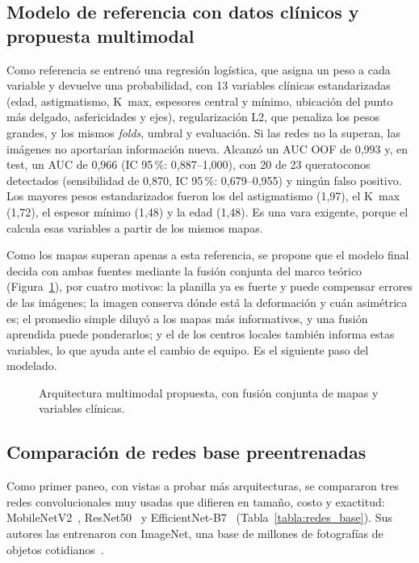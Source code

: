     \subsection{Modelo de referencia con datos clínicos y propuesta multimodal}

        Como referencia se entrenó una regresión logística, que asigna un peso a cada variable y devuelve una probabilidad, con 13 variables clínicas estandarizadas (edad, astigmatismo, K~max, espesores central y mínimo, ubicación del punto más delgado, asfericidades y ejes), regularización L2, que penaliza los pesos grandes, y los mismos \textit{folds}, umbral y evaluación. Si las redes no la superan, las imágenes no aportarían información nueva. Alcanzó un AUC OOF de 0,993 y, en test, un AUC de 0,966 (IC 95\,\%: 0,887--1,000), con 20 de 23 queratoconos detectados (sensibilidad de 0,870, IC 95\,\%: 0,679--0,955) y ningún falso positivo. Los mayores pesos estandarizados fueron los del astigmatismo (\textminus{}1,97), el K~max (1,72), el espesor mínimo (\textminus{}1,48) y la edad (\textminus{}1,48). Es una vara exigente, porque el \Orbscan{} calcula esas variables a partir de los mismos mapas.

        Como los mapas superan apenas a esta referencia, se propone que el modelo final decida con ambas fuentes mediante la fusión conjunta del marco teórico~\cite{huang_fusion} (Figura~\ref{fig:esquema_fusion}), por cuatro motivos: la planilla ya es fuerte y puede compensar errores de las imágenes; la imagen conserva dónde está la deformación y cuán asimétrica es; el promedio simple diluyó a los mapas más informativos, y una fusión aprendida puede ponderarlos; y el \Pentacam{} de los centros locales también informa estas variables, lo que ayuda ante el cambio de equipo. Es el siguiente paso del modelado.

        \begin{figure}[!htbp] \centering
            
            \caption{Arquitectura multimodal propuesta, con fusión conjunta de mapas y variables clínicas.}
            \label{fig:esquema_fusion}
        \end{figure}

    \subsection{Comparación de redes base preentrenadas}

        Como primer paneo, con vistas a probar más arquitecturas, se compararon tres redes convolucionales muy usadas que difieren en tamaño, costo y exactitud: MobileNetV2~\cite{mobilenetv2}, ResNet50~\cite{resnet} y EfficientNet-B7~\cite{efficientnet} (Tabla~\ref{tabla:redes_base}). Sus autores las entrenaron con ImageNet, una base de millones de fotografías de objetos cotidianos~\cite{imagenet}.

